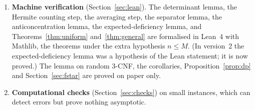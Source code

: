 \documentclass[11pt,a4paper]{article}
\theoremstyle{definition}
\theoremstyle{remark}
\newcommand{\sep}{\operatorname{sep}}
\begin{document}
\begin{enumerate}
 For a random 3-CNF of density $\Delta\ge2$, the formula $F^\star$ obtained by one copy per
 occurrence on Tovey cycles has $\sep(F^\star)=\Omega_\Delta(n)$ with high probability, so
 the product-type bound $2^{\Omega_\Delta(n^{2/3})}$ extends to schemes applied to
 $F^\star$. That the preprint's $F^\star$ is this formula is an inference from the wording
 of~\cite{DL}, not something we checked in the preprint.
\item \textbf{Machine verification} (Section~\ref{sec:lean}). The determinant lemma, the
 Hermite counting step, the averaging step, the separator lemma, the anticoncentration
 lemma, the expected-deficiency lemma, and Theorems~\ref{thm:uniform}
 and~\ref{thm:general} are formalised in Lean~4 with Mathlib, the theorems under the extra
 hypothesis $n\le M$. (In version~2 the expected-deficiency lemma was a hypothesis of the
 Lean statement; it is now proved.) The lemma on random 3-CNF, the corollaries,
 Proposition~\ref{prop:dp} and Section~\ref{sec:fstar} are proved on paper only.
\item \textbf{Computational checks} (Section~\ref{sec:checks}) on small instances, which can
 detect errors but prove nothing asymptotic.
\end{enumerate}
\end{document}

